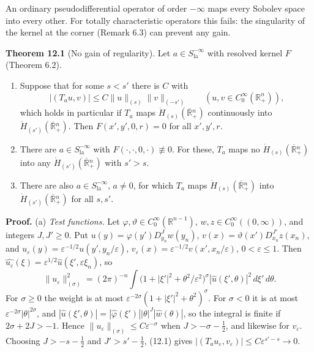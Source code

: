 \documentclass[
  11pt,
]{article}
\begin{document}
An ordinary pseudodifferential operator of order \(-\infty\) maps every
Sobolev space into every other. For totally characteristic operators
this fails: the singularity of the kernel at the corner (Remark 6.3) can
prevent any gain.

\textbf{Theorem 12.1} (No gain of regularity). Let
\(a\in S^{-\infty}_{\mathrm{la}}\) with resolved kernel \(F\) (Theorem
6.2).

\begin{enumerate}
\def\labelenumi{(\alph{enumi})}
\item
  Suppose that for some \(s<s'\) there is \(C\) with \[
|(T_au,v)|\leq C\|u\|_{(s)}\|v\|_{(-s')}\qquad(u,v\in C_0^\infty(\mathbb R^n_+)),
\tag{12.1}
\] which holds in particular if \(T_a\) maps
  \(\dot H_{(s)}(\overline{\mathbb R}{}^n_+)\) continuously into
  \(\dot H_{(s')}(\overline{\mathbb R}{}^n_+)\). Then \(F(x',y',0,r)=0\)
  for all \(x',y',r\).
\item
  There are \(a\in S^{-\infty}_{\mathrm{la}}\) with
  \(F(\cdot,\cdot,0,\cdot)\not\equiv0\). For these, \(T_a\) maps no
  \(\dot H_{(s)}(\overline{\mathbb R}{}^n_+)\) into any
  \(\dot H_{(s')}(\overline{\mathbb R}{}^n_+)\) with \(s'>s\).
\item
  There are also \(a\in S^{-\infty}_{\mathrm{la}}\), \(a\neq0\), for
  which \(T_a\) maps \(\dot H_{(s)}(\overline{\mathbb R}{}^n_+)\) into
  \(\dot H_{(s')}(\overline{\mathbb R}{}^n_+)\) for all \(s,s'\).
\end{enumerate}

\textbf{Proof.} (a) \emph{Test functions.} Let
\(\varphi,\vartheta\in C_0^\infty(\mathbb R^{n-1})\),
\(w,z\in C_0^\infty((0,\infty))\), and integers \(J,J'\geq0\). Put
\(u(y)=\varphi(y')D^J_{y_n}w(y_n)\),
\(v(x)=\vartheta(x')D^{J'}_{x_n}z(x_n)\), and
\(u_\varepsilon(y)=\varepsilon^{-1/2}u(y',y_n/\varepsilon)\),
\(v_\varepsilon(x)=\varepsilon^{-1/2}v(x',x_n/\varepsilon)\),
\(0<\varepsilon\leq1\). Then
\(\widehat{u_\varepsilon}(\xi)=\varepsilon^{1/2}\widehat u(\xi',\varepsilon\xi_n)\),
so \[
\|u_\varepsilon\|^2_{(\sigma)}=(2\pi)^{-n}\int\big(1+|\xi'|^2+\theta^2/\varepsilon^2\big)^\sigma|\widehat u(\xi',\theta)|^2\,d\xi'\,d\theta .
\] For \(\sigma\geq0\) the weight is at most
\(\varepsilon^{-2\sigma}(1+|\xi'|^2+\theta^2)^\sigma\). For \(\sigma<0\)
it is at most \(\varepsilon^{-2\sigma}|\theta|^{2\sigma}\), and
\(|\widehat u(\xi',\theta)|=|\widehat\varphi(\xi')||\theta|^J|\widehat w(\theta)|\),
so the integral is finite if \(2\sigma+2J>-1\). Hence
\(\|u_\varepsilon\|_{(\sigma)}\leq C\varepsilon^{-\sigma}\) when
\(J>-\sigma-\tfrac12\), and likewise for \(v_\varepsilon\). Choosing
\(J>-s-\tfrac12\) and \(J'>s'-\tfrac12\), (12.1) gives
\(|(T_au_\varepsilon,v_\varepsilon)|\leq C\varepsilon^{s'-s}\to0\).
\end{document}
